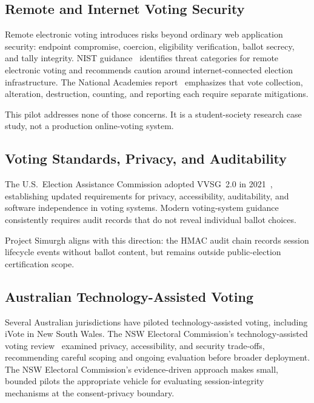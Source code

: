 \documentclass[conference]{IEEEtran}
\newcommand{\sys}{Project Simurgh}
\begin{document}
\subsection{Remote and Internet Voting Security}

Remote electronic voting introduces risks beyond ordinary web application
security: endpoint compromise, coercion, eligibility verification, ballot
secrecy, and tally integrity. NIST guidance~\cite{nistir7770} identifies threat
categories for remote electronic voting and recommends caution around
internet-connected election infrastructure. The National Academies
report~\cite{nationalacademies2018} emphasizes that vote collection, alteration,
destruction, counting, and reporting each require separate mitigations.

This pilot addresses none of those concerns. It is a student-society research
case study, not a production online-voting system.

\subsection{Voting Standards, Privacy, and Auditability}

The U.S.\ Election Assistance Commission adopted VVSG~2.0 in
2021~\cite{vvsg2021}, establishing updated requirements for privacy,
accessibility, auditability, and software independence in voting systems.
Modern voting-system guidance consistently requires audit records that do not
reveal individual ballot choices.

\sys{} aligns with this direction: the HMAC audit chain records session
lifecycle events without ballot content, but remains outside public-election
certification scope.

\subsection{Australian Technology-Assisted Voting}

Several Australian jurisdictions have piloted technology-assisted voting,
including iVote in New South Wales. The NSW Electoral Commission's
technology-assisted voting review~\cite{nswec2023tav} examined privacy,
accessibility, and security trade-offs, recommending careful scoping and
ongoing evaluation before broader deployment. The NSW Electoral Commission's evidence-driven approach makes small, bounded
pilots the appropriate vehicle for evaluating session-integrity mechanisms at
the consent-privacy boundary.
\end{document}
